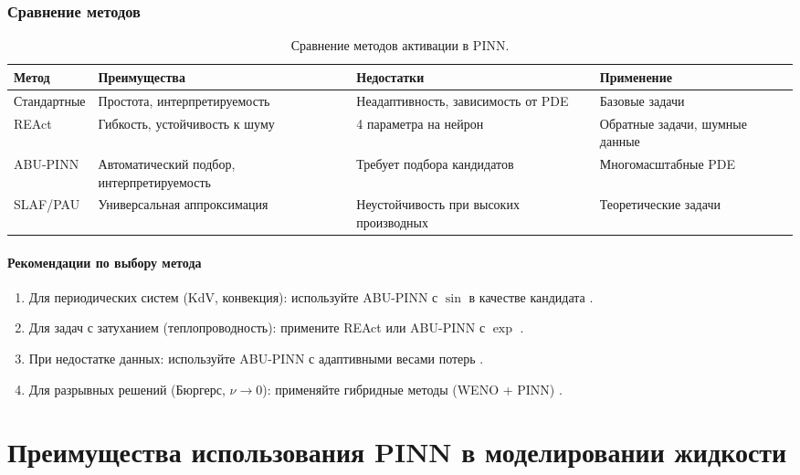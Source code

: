 \subsubsection{Сравнение методов}
\begin{table}[h]
\centering
\begin{tabular}{|l|p{4cm}|p{4cm}|p{4cm}|}
\hline
\textbf{Метод} & \textbf{Преимущества} & \textbf{Недостатки} & \textbf{Применение} \\ \hline
Стандартные & Простота, интерпретируемость & Неадаптивность, зависимость от PDE & Базовые задачи \\ \hline
REAct & Гибкость, устойчивость к шуму & 4 параметра на нейрон & Обратные задачи, шумные данные \\ \hline
ABU-PINN & Автоматический подбор, интерпретируемость & Требует подбора кандидатов & Многомасштабные PDE \\ \hline
SLAF/PAU & Универсальная аппроксимация & Неустойчивость при высоких производных & Теоретические задачи \\ \hline
\end{tabular}
\caption{Сравнение методов активации в PINN.}
\label{tab:activation_methods}
\end{table}

\paragraph{Рекомендации по выбору метода}
\begin{enumerate}
    \item Для периодических систем (KdV, конвекция): используйте ABU-PINN с $\sin$ в качестве кандидата \cite{7fcd4b3c875d8e41eb0c184aa1a42bf4c8906d61}.
    \item Для задач с затуханием (теплопроводность): примените REAct или ABU-PINN с $\exp$ \cite{0d752c79fb816703274a3d37f85a85689a2a9405}\cite{7fcd4b3c875d8e41eb0c184aa1a42bf4c8906d61}.
    \item При недостатке данных: используйте ABU-PINN с адаптивными весами потерь \cite{7fcd4b3c875d8e41eb0c184aa1a42bf4c8906d61}.
    \item Для разрывных решений (Бюргерс, $\nu \to 0$): применяйте гибридные методы (WENO + PINN) \cite{7fcd4b3c875d8e41eb0c184aa1a42bf4c8906d61}.
\end{enumerate}


\section{Преимущества использования PINN в моделировании жидкости}
